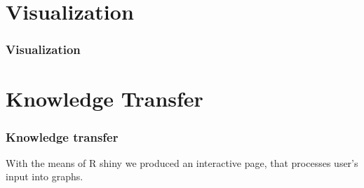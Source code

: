 \documentclass {beamer}
\begin{document}
\section{Visualization}
\begin{frame}
\frametitle{Visualization}

\end{frame}


\section{Knowledge Transfer}
\begin{frame}
\frametitle{Knowledge transfer}
With the means of R shiny we produced an interactive page, that processes user's input into graphs.

\end{frame}
\end{document}
